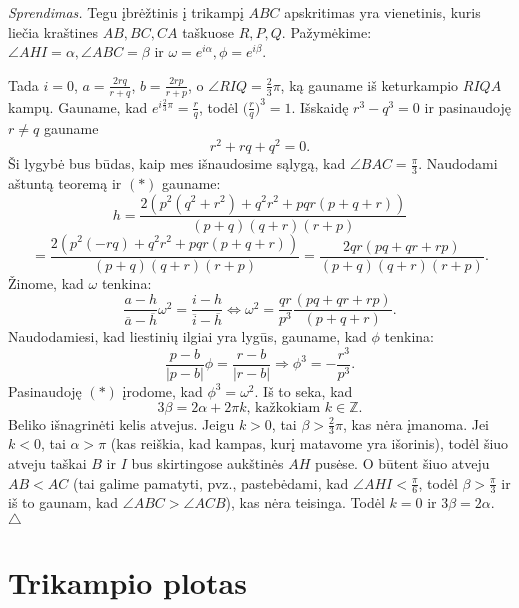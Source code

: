 \documentclass[11pt,a4paper,twoside]{book}
\newenvironment{sprendimas}{\noindent \textit{Sprendimas.}}{\hfill $\triangle$}
\theoremstyle{definition} \newtheorem*{api}{Apibrėžimas}
\theoremstyle{remark} \newtheorem*{pastaba}{Pastaba}
\begin{document}
\begin{sprendimas}
Tegu įbrėžtinis į trikampį $ABC$ apskritimas yra vienetinis, kuris liečia kraštines $AB, BC, CA$ taškuose $R, P, Q$. Pažymėkime: $\angle AHI = \alpha, \angle ABC = \beta$ ir $\omega = e^{i\alpha}, \phi = e^{i\beta}$.

Tada $i=0$, $a=\frac{2rq}{r+q}$, $b=\frac{2rp}{r+p}$, o $\angle RIQ=\frac{2}{3}\pi$, ką gauname iš keturkampio $RIQA$ kampų. Gauname, kad $e^{i\frac{2}{3}\pi}=\frac{r}{q}$, todėl $\Big(\frac{r}{q}\Big)^3=1$. Išskaidę $r^3-q^3=0$ ir pasinaudoję $r\ne q$ gauname
\begin{equation}
r^2 + rq + q^2 = 0. \tag{$*$}
\end{equation}
Ši lygybė bus būdas, kaip mes išnaudosime sąlygą, kad $\angle BAC = \frac{\pi}{3}$.
Naudodami aštuntą teoremą ir $(*)$ gauname:
$$h=\frac{2(p^2(q^2 + r^2) + q^2r^2  + pqr(p + q+ r))}{(p+q)(q+r)(r+p)}$$
$$=\frac{2(p^2(-rq) + q^2r^2  + pqr(p + q+ r))}{(p+q)(q+r)(r+p)}=\frac{2qr(pq +qr+rp)}{(p+q)(q+r)(r+p)}.$$
Žinome, kad $\omega$ tenkina:
$$\frac{a-h}{\overline{a}-\overline{h}}\omega^2=\frac{i-h}{\overline{i}-\overline{h}} \Leftrightarrow \omega^2=\frac{qr}{p^3}\frac{(pq +qr+rp)}{(p+q+r)}.$$
Naudodamiesi, kad liestinių ilgiai yra lygūs, gauname, kad $\phi$ tenkina:
$$\frac{p-b}{|p-b|}\phi=\frac{r-b}{|r-b|} \Rightarrow \phi^3=-\frac{r^3}{p^3}.$$
Pasinaudoję $(*)$ įrodome, kad $\phi^3=\omega^2.$ Iš to seka, kad
$$3\beta=2\alpha + 2\pi k \text{, kažkokiam } k\in\mathbb{Z}.$$
Beliko išnagrinėti kelis atvejus. Jeigu $k>0$, tai $\beta>\frac{2}{3}\pi$, kas nėra įmanoma. Jei $k<0$, tai $\alpha > \pi$ (kas reiškia, kad kampas, kurį matavome yra išorinis), todėl šiuo atveju taškai $B$ ir $I$ bus skirtingose aukštinės $AH$ pusėse. O būtent šiuo atveju $AB<AC$ (tai galime pamatyti, pvz., pastebėdami, kad $\angle AHI < \frac{\pi}{6}$, todėl $\beta > \frac{\pi}{3}$ ir iš to gaunam, kad $\angle ABC > \angle ACB$), kas nėra teisinga. Todėl $k=0$ ir $3\beta=2\alpha$.
\end{sprendimas}


















\chapter{Trikampio plotas}
\end{document}
